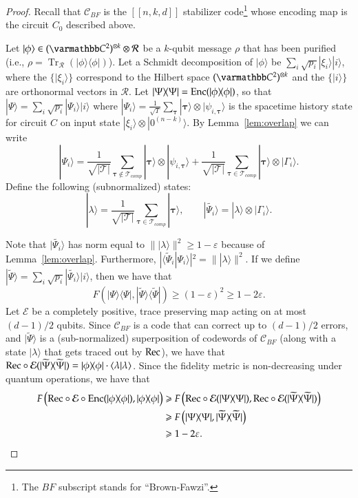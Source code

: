 \documentclass[11pt,letterpaper]{article}
\theoremstyle{definition}
\theoremstyle{remark}
\let\mathbb\varmathbb
\newcommand{\Paren}[1]{\left(#1\right)}
\DeclareMathOperator{\Tr}{Tr}
\newcommand{\C}{\mathbb C}
\newcommand{\cC}{\mathcal C}
\newcommand{\cE}{\mathcal E}
\newcommand{\cT}{\mathcal T}
\renewcommand{\geq}{\geqslant}
\let\epsilon=\varepsilon
\numberwithin{equation}{section}
\newcommand{\eps}{\epsilon}
\theoremstyle{definition}
\newcommand{\wt}[1]{\widetilde{#1}}
\newcommand{\ket}[1]{|#1\rangle}
\newcommand{\ip}[2]{\langle #1 | #2 \rangle}
\newcommand{\ketbra}[2]{|#1\rangle\! \langle #2|}
\newcommand{\timeconfig}{{\bm{\tau}}}
\begin{document}
\begin{proof}
Recall that $\cC_{BF}$ is the $[[n,k,d]]$ stabilizer code\footnote{The $BF$ subscript stands for ``Brown-Fawzi''.} whose encoding map is the circuit $C_0$ described above. 

Let $\ket{\phi} \in (\C^2)^{\otimes k} \otimes \mathcal{R}$ be a $k$-qubit message $\rho$ that has been purified (i.e., $\rho = \Tr_{\mathcal{R}}(\ketbra{\phi}{\phi})$). Let a Schmidt decomposition of $\ket{\phi}$ be $\sum_i \sqrt{p_i} \ket{\xi_i} \ket{i}$, where the $\{ \ket{\xi_i} \}$ correspond to the Hilbert space $(\C^2)^{\otimes k}$ and the $\{ \ket{i} \}$ are orthonormal vectors in $\mathcal{R}$. Let $\ketbra{\Psi}{\Psi} = \Enc(\ketbra{\phi}{\phi})$, so that $\ket{\Psi} = \sum_i \sqrt{p_i} \ket{\Psi_i} \ket{i}$ where 
$\ket{\Psi_i} = \frac{1}{\sqrt{T}} \sum_{\timeconfig} \ket{\timeconfig} \otimes \ket{\psi_{i,\timeconfig}}$ is the spacetime history state for circuit $C$ on input state $\ket{\xi_i}\otimes \ket{0^{(n-k)}}$. 
By Lemma~\ref{lem:overlap} we can write
\begin{equation}
  \ket{\Psi_i} = \frac{1}{\sqrt{|\cT|}} \sum_{\timeconfig \notin \cT_{comp}} \ket{\timeconfig} \otimes \ket{\psi_{i,\timeconfig}} + \frac{1}{\sqrt{|\cT|}} \sum_{\timeconfig \in \cT_{comp}} \ket{\timeconfig}\otimes \ket{\Gamma_i}.
\end{equation}
Define the following (subnormalized) states:
\begin{equation}
  \ket{\lambda} = \frac{1}{\sqrt{|\cT|}} \sum_{\timeconfig \in \cT_{comp}} \ket{\timeconfig}, \qquad \ket{\wt{\Psi_i}} = \ket{\lambda} \otimes \ket{\Gamma_i}.
\end{equation}

Note that $\ket{\wt{\Psi_i}}$ has norm equal to $\| \ket{\lambda} \|^2 \geq 1 - \eps$ because of Lemma~\ref{lem:overlap}. Furthermore, $| \ip{\wt{\Psi}_i}{\Psi_i}|^2 = \| \ket{\lambda} \|^2$. If we define $\ket{\wt{\Psi}} = \sum_i \sqrt{p_i} \ket{\wt{\Psi_i}} \ket{i}$, then we have that
\begin{equation}
  F(\ketbra{\Psi}{\Psi}, \ketbra{\wt{\Psi}}{\wt{\Psi}}) \geq (1 - \eps)^2 \geq 1 - 2\eps.
\end{equation}
Let $\cE$ be a completely positive, trace preserving map acting on at most $(d - 1)/2$ qubits. Since $\cC_{BF}$ is a code that can correct up to $(d-1)/2$ errors, and $\ket{\wt{\Psi}}$ is a (sub-normalized) superposition of codewords of $\cC_{BF}$ (along with a state $\ket{\lambda}$ that gets traced out by $\mathrm{Rec}$), we have that $\Rec \circ \cE(\ketbra{\wt{\Psi}}{\wt{\Psi}}) = \ketbra{\phi}{\phi} \cdot \ip{\lambda}{\lambda}$. Since the fidelity metric is non-decreasing under quantum operations, we have that
\begin{align}
F \Paren{ \Rec \circ \cE \circ \Enc(\ketbra{\phi}{\phi}), \ketbra{\phi}{\phi} } 
 &\geq F \Paren{ \Rec \circ \cE(\ketbra{\Psi}{\Psi}) , \Rec \circ \cE(\ketbra{\wt{\Psi}}{\wt{\Psi}}) } \\
 &\geq F \Paren{ \ketbra{\Psi}{\Psi} , \ketbra{\wt{\Psi}}{\wt{\Psi}} }\\
&\geq 1 - 2\eps.
\end{align}


\end{proof}
\end{document}
